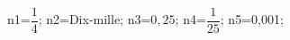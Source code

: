 \documentclass[exercice]{thedocument}%
\begin{document}
%
    \>n1=$\dfrac{1}{4}$;%
    \>n2=Dix-mille;%
    \>n3=$0,25$;%
    \>n4=$\dfrac{1}{25}$;%
    \>n5=0,001;%
\end{document}
